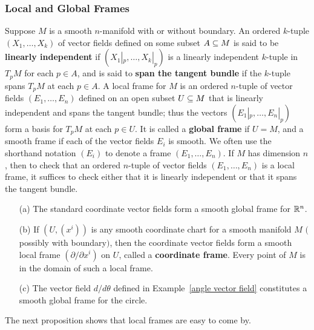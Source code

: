 \subsubsection{Local and Global Frames}
Suppose $M$ is a smooth $n$-manifold with or without boundary. An ordered $k$-tuple $(X_1,\dots,X_k)$ of vector fields defined on some subset $A\subseteq M$ is said to be \textbf{linearly independent} if $(X_1|_p,\dots,X_k|_p)$ is a linearly independent $k$-tuple in $T_pM$ for each $p\in A$, and is said to \textbf{span the tangent bundle} if the $k$-tuple spans $T_pM$ at each $p\in A$. A local frame for $M$ is an ordered $n$-tuple of vector fields $(E_1,\dots,E_n)$ defined on an open subset $U\subseteq M$ that is linearly independent and spans the tangent bundle; thus the vectors $(E_1|_p,\dots,E_n|_p)$ form a basis for $T_pM$ at each $p\in U$. It is called a \textbf{global frame} if $U=M$, and a smooth frame if each of the vector fields $E_i$ is smooth. We often use the shorthand notation $(E_i)$ to denote a frame $(E_1,\dots,E_n)$. If $M$ has dimension $n$, then to check that an ordered $n$-tuple of vector fields $(E_1,\dots,E_n)$ is a local frame, it suffices to check either that it is linearly independent or that it spans the tangent bundle.
\begin{example}
\mbox{}
\begin{itemize}
\item[(a)] The standard coordinate vector fields form a smooth global frame for $\mathbb{R}^n$.
\item[(b)] If $(U,(x^i))$ is any smooth coordinate chart for a smooth manifold $M$ $($possibly with boundary$)$, then the coordinate vector fields form a smooth local frame $(\partial/\partial x^i)$ on $U$, called a \textbf{coordinate frame}. Every point of $M$ is in the domain of such a local frame.
\item[(c)] The vector field $d/d\theta$ defined in Example~\ref{angle vector field} constitutes a smooth global frame for the circle.
\end{itemize}
\end{example}
The next proposition shows that local frames are easy to come by.
